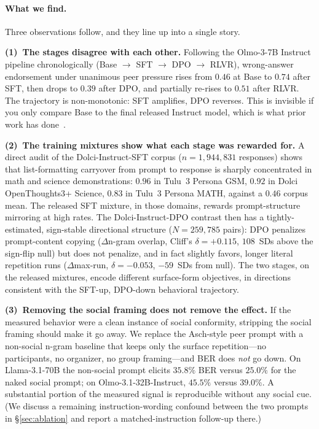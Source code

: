 \documentclass[11pt]{article}
\begin{document}
\paragraph{What we find.}
Three observations follow, and they line up into a single story.

\textbf{(1)~The stages disagree with each other.} Following the Olmo-3-7B Instruct pipeline chronologically (Base $\to$ SFT $\to$ DPO $\to$ RLVR), wrong-answer endorsement under unanimous peer pressure rises from $0.46$ at Base to $0.74$ after SFT, then drops to $0.39$ after DPO, and partially re-rises to $0.51$ after RLVR. The trajectory is non-monotonic: SFT amplifies, DPO reverses. This is invisible if you only compare Base to the final released Instruct model, which is what prior work has done~\citep{zhu2025conformity}.

\textbf{(2)~The training mixtures show what each stage was rewarded for.} A direct audit of the Dolci-Instruct-SFT corpus ($n{=}1{,}944{,}831$ responses) shows that list-formatting carryover from prompt to response is sharply concentrated in math and science demonstrations: $0.96$ in Tulu~3 Persona GSM, $0.92$ in Dolci OpenThoughts3+ Science, $0.83$ in Tulu~3 Persona MATH, against a $0.46$ corpus mean. The released SFT mixture, in those domains, rewards prompt-structure mirroring at high rates. The Dolci-Instruct-DPO contrast then has a tightly-estimated, sign-stable directional structure ($N{=}259{,}785$ pairs): DPO penalizes prompt-content copying ($\Delta$n-gram overlap, Cliff's $\delta{=}{+}0.115$, $108$~SDs above the sign-flip null) but does not penalize, and in fact slightly favors, longer literal repetition runs ($\Delta$max-run, $\delta{=}{-}0.053$, $-59$~SDs from null). The two stages, on the released mixtures, encode different surface-form objectives, in directions consistent with the SFT-up, DPO-down behavioral trajectory.

\textbf{(3)~Removing the social framing does not remove the effect.} If the measured behavior were a clean instance of social conformity, stripping the social framing should make it go away. We replace the Asch-style peer prompt with a non-social n-gram baseline that keeps only the surface repetition---no participants, no organizer, no group framing---and BER does \emph{not} go down. On Llama-3.1-70B the non-social prompt elicits $35.8\%$ BER versus $25.0\%$ for the naked social prompt; on Olmo-3.1-32B-Instruct, $45.5\%$ versus $39.0\%$. A substantial portion of the measured signal is reproducible without any social cue. (We discuss a remaining instruction-wording confound between the two prompts in \S\ref{sec:ablation} and report a matched-instruction follow-up there.)
\end{document}
